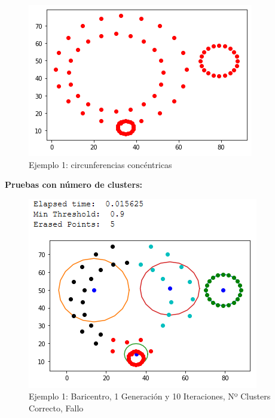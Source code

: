 \documentclass[conference,a4paper]{IEEEtran}
\begin{document}
\begin{figure}[H]
\centering
\includegraphics[scale=0.65]{Experimentacion/Ejemplo1/Ejemplo1}
\caption{Ejemplo 1: circunferencias concéntricas\\}
\end{figure}

\textbf{Pruebas con número de clusters:}\\

\begin{figure}[H]
\centering
\includegraphics[scale=0.65]{Experimentacion/Ejemplo1/ej1_b_1_10_cc}
\caption{Ejemplo 1: Baricentro, 1 Generación y 10 Iteraciones,  Nº Clusters Correcto, Fallo\\}
\end{figure}
\end{document}
